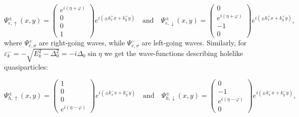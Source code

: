 \begin{equation}
    \Psi^{\pm}_{e,\uparrow}(x,y) = 
    \begin{pmatrix}
        e^{i(\eta + \varphi)} \\ 0 \\ 0 \\ 1
    \end{pmatrix}e^{i(\pm k_x^{+}x + k_y^+y)}
    \quad \mathrm{and} \quad 
    \Psi^{\pm}_{e,\downarrow}(x,y) = 
    \begin{pmatrix}
        0 \\ e^{i(\eta+\varphi)} \\ -1 \\0
    \end{pmatrix}e^{i(\pm k_x^+x +k_y^+y)},
\end{equation}
where $\Psi^+_{e,\sigma}$ are right-going waves, while $\Psi^-_{e,\sigma}$ are left-going waves. Similarly, for $\varepsilon^-_k = -\sqrt{E_k^2-\Delta_0^2} = -i\Delta_0\sin\eta$ we get the wave-functions describing holelike quasiparticles:
\begin{comment}
Similarly, the wave functions corresponding to the eigenvalue $-E_{k,S}$ give
\begin{equation}
\begin{pmatrix}
\big(\varepsilon_{k,S} + E_{k,S}\big) \hat{\sigma}_0 & i\Delta\hat{\sigma}_2 \\
-i\Delta^*\hat{\sigma}_2 & -\big(\varepsilon_{k,S} - E_{k,S}\big)\hat{\sigma_0}  
\end{pmatrix}
\sim
\begin{pmatrix}
\hat{\sigma}_0 & i\frac{v_0}{u_0}e^{i\gamma}\hat{\sigma}_2 \\
0 & 0
\end{pmatrix}
\end{equation}
which give the solutions
\end{comment}
\begin{equation}
    \Psi^{\pm}_{h,\uparrow}(x,y) = 
    \begin{pmatrix}
        1\\0\\0 \\ e^{i(\eta-\varphi)}
    \end{pmatrix}e^{i(\pm k_x^-x + k_y^-y)}
    \quad \mathrm{and} \quad 
    \Psi^{\pm}_{h,\downarrow}(x,y) = 
    \begin{pmatrix}
        0\\-1 \\e^{i(\eta-\varphi)}\\0
    \end{pmatrix}e^{i(\pm k_x^-x + k_y^-y)},
\end{equation}
